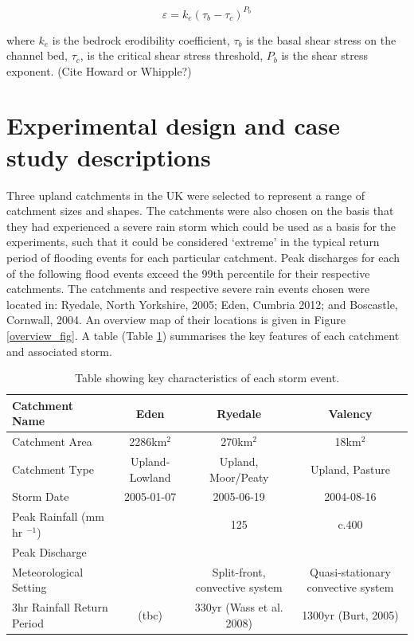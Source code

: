 \begin{equation}
\varepsilon = k_e(\tau_b - \tau_c)^{P_b}
\end{equation}

where \(k_e\) is the bedrock erodibility coefficient, \(\tau_b\) is the basal shear stress on the channel bed, \(\tau_c\), is the critical shear stress threshold, \(P_b\) is the shear stress exponent. (Cite Howard or Whipple?)

\section{Experimental design and case study descriptions}
Three upland catchments in the UK were selected to represent a range of catchment sizes and shapes. The catchments were also chosen on the basis that they had experienced a severe rain storm which could be used as a basis for the experiments, such that it could be considered `extreme' in the typical return period of flooding events for each particular catchment. Peak discharges for each of the following flood events exceed the 99th percentile for their respective catchments. The catchments and respective severe rain events chosen were located in: Ryedale, North Yorkshire, 2005; Eden, Cumbria 2012; and Boscastle, Cornwall, 2004. An overview map of their locations is given in Figure \ref{overview_fig}. A table (Table \ref{met_setting}) summarises the key features of each catchment and associated storm.

\linespread{1.3}
\begin{table}
\resizebox{\textwidth}{!}
{%
\begin{tabular}{l c c c} \hline

Catchment Name& \textbf{Eden} 			& \textbf{Ryedale} &  \textbf{Valency} \\ \hline
Catchment Area & 2286km$^2$ 			& 270km$^2$ 				& 18km$^2$ \\ 
Catchment Type & Upland-Lowland & Upland, Moor/Peaty & Upland, Pasture \\ 
Storm Date	 		&  2005-01-07	 & 2005-06-19 	& 2004-08-16 \\ 
Peak Rainfall	 (mm hr \(^{-1}\)) & & 125  & c.400 \\
Peak Discharge	 	& & & \\ 
Meteorological Setting	& 	& Split-front, convective system & Quasi-stationary convective system \\ 
3hr Rainfall Return Period 		& (tbc)	 & 330yr (Wass et al. 2008)	& 1300yr (Burt, 2005) \\ \hline
\end{tabular}
}
\caption{Table showing key characteristics of each storm event.}
\label{met_setting}
\end{table}


